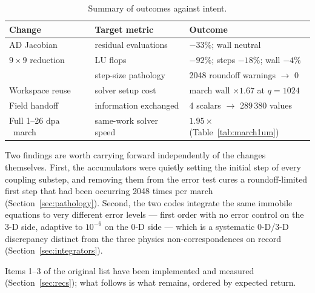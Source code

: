 \documentclass[11pt,a4paper]{article}
\newcommand{\dpa}{\ensuremath{\mathrm{dpa}}}
\begin{document}
\begin{table}[htb]
\centering
\caption{Summary of outcomes against intent.}
\begin{tabular}{lll}
\toprule
Change & Target metric & Outcome \\
\midrule
AD Jacobian        & residual evaluations & $-33\%$; wall neutral \\
$9\times9$ reduction & LU flops           & $-92\%$; steps $-18\%$; wall $-4\%$ \\
                   & step-size pathology  & 2048 roundoff warnings $\to$ 0 \\
Workspace reuse    & solver setup cost    & march wall $\times1.67$ at $q=1024$ \\
Field handoff      & information exchanged & 4 scalars $\to$ 289\,380 values \\
Full 1--26 \dpa\ march & same-work solver speed & $1.95\times$ (Table~\ref{tab:march1um}) \\
\bottomrule
\end{tabular}
\end{table}

\noindent
Two findings are worth carrying forward independently of the changes
themselves. First, the accumulators were quietly setting the initial step of
every coupling substep, and removing them from the error test cures a
roundoff-limited first step that had been occurring 2048 times per march
(Section~\ref{sec:pathology}). Second, the two codes integrate the same immobile
equations to very different error levels --- first order with no error control
on the 3-D side, adaptive to $10^{-6}$ on the 0-D side --- which is a systematic
0-D/3-D discrepancy distinct from the three physics non-correspondences on
record (Section~\ref{sec:integrators}).

Items 1--3 of the original list have been implemented and measured
(Section~\ref{sec:recs}); what follows is what remains, ordered by expected
return.
\end{document}
